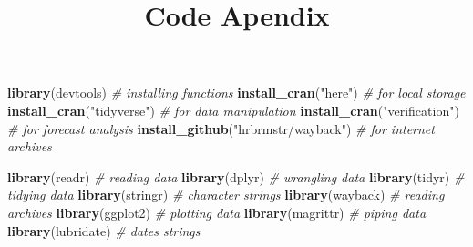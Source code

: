 \documentclass[]{article}
\title{Code Apendix}
\author{}
\date{}
\newenvironment{Shaded}{\begin{snugshade}}{\end{snugshade}}
\newcommand{\CommentTok}[1]{\textcolor[rgb]{0.56,0.35,0.01}{\textit{#1}}}
\newcommand{\KeywordTok}[1]{\textcolor[rgb]{0.13,0.29,0.53}{\textbf{#1}}}
\newcommand{\NormalTok}[1]{#1}
\newcommand{\StringTok}[1]{\textcolor[rgb]{0.31,0.60,0.02}{#1}}
\begin{document}
\maketitle

\begin{Shaded}
\begin{Highlighting}[]
\KeywordTok{library}\NormalTok{(devtools) }\CommentTok{# installing functions}
\KeywordTok{install_cran}\NormalTok{(}\StringTok{"here"}\NormalTok{) }\CommentTok{# for local storage}
\KeywordTok{install_cran}\NormalTok{(}\StringTok{"tidyverse"}\NormalTok{) }\CommentTok{# for data manipulation}
\KeywordTok{install_cran}\NormalTok{(}\StringTok{"verification"}\NormalTok{) }\CommentTok{# for forecast analysis}
\KeywordTok{install_github}\NormalTok{(}\StringTok{"hrbrmstr/wayback"}\NormalTok{) }\CommentTok{# for internet archives}
\end{Highlighting}
\end{Shaded}

\begin{Shaded}
\begin{Highlighting}[]
\KeywordTok{library}\NormalTok{(readr)     }\CommentTok{# reading data}
\KeywordTok{library}\NormalTok{(dplyr)     }\CommentTok{# wrangling data}
\KeywordTok{library}\NormalTok{(tidyr)     }\CommentTok{# tidying data}
\KeywordTok{library}\NormalTok{(stringr)   }\CommentTok{# character strings}
\KeywordTok{library}\NormalTok{(wayback)   }\CommentTok{# reading archives}
\KeywordTok{library}\NormalTok{(ggplot2)   }\CommentTok{# plotting data}
\KeywordTok{library}\NormalTok{(magrittr)  }\CommentTok{# piping data}
\KeywordTok{library}\NormalTok{(lubridate) }\CommentTok{# dates strings}
\end{Highlighting}
\end{Shaded}
\end{document}
